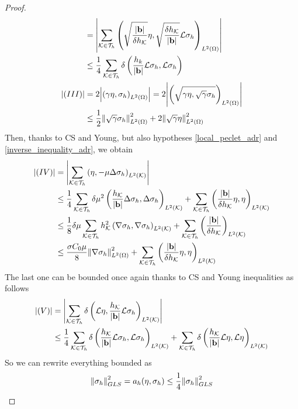 \begin{proof}
\begin{align*}
        & = \abs{\sum_{\mathcal{K}\in\mathcal{T}_h} \left( \sqrt{\frac{\abs{\textbf{b}}}{\delta h_{\mathcal{K}}}} \eta, \sqrt{\frac{\delta h_{\mathcal{K}}}{\abs{\textbf{b}}}} \mathcal{L}\sigma_h \right)_{L^2(\Omega)}} \\
        &\leq \frac{1}{4} \sum_{\mathcal{K}\in\mathcal{T}_h} \delta \left( \frac{h_k}{\abs{\textbf{b}}} \mathcal{L}\sigma_h, \mathcal{L}\sigma_h \right) \\
        \abs{(III)} &= 2\abs{\left( \gamma \eta, \sigma_h \right)_{L^2(\Omega)}} = 2\abs{\left( \sqrt{\gamma \eta, \sqrt{\gamma}\sigma_h} \right)_{L^2(\Omega)}} \\
        &\leq \frac{1}{2} \norm{\sqrt{\gamma}\sigma_h}_{L^2(\Omega)}^2 + 2 \norm{\sqrt{\gamma} \eta}_{L^2(\Omega)}^2
    \end{align*}
    Then, thanks to CS and Young, but also hypotheses \eqref{local_peclet_adr} and \eqref{inverse_inequality_adr}, we obtain 
    \begin{align*}
        \abs{(IV)} &= \abs{\sum_{\mathcal{K}\in\mathcal{T}_h} \left( \eta, -\mu \Delta \sigma_h \right)_{L^2(\mathcal{K})}} \\
        &\leq \frac{1}{4} \sum_{\mathcal{K}\in\mathcal{T}_h} \delta \mu^2 \left( \frac{h_{\mathcal{K}}}{\abs{\textbf{b}}}\Delta \sigma_h, \Delta \sigma_h \right)_{L^2(\mathcal{K})} + \sum_{\mathcal{K}\in\mathcal{T}_h} \left( \frac{\abs{\textbf{b}}}{\delta h_{\mathcal{K}}} \eta, \eta \right)_{L^2(\mathcal{K})} \\
        &\leq \frac{1}{8} \delta \mu \sum_{\mathcal{K}\in\mathcal{T}_h} h^2_{\mathcal{K}} \left( \nabla \sigma_h, \nabla \sigma_h \right)_{L^2(\mathcal{K})} + \sum_{\mathcal{K}\in\mathcal{T}_h} \left( \frac{\abs{\textbf{b}}}{\delta h_{\mathcal{K}}} \right)_{L^2(\mathcal{K})} \\
        &\leq \frac{\sigma C_0 \mu}{8} \norm{\nabla \sigma_h}_{L^2(\Omega)}^2 + \sum_{\mathcal{K}\in\mathcal{T}_h} \left( \frac{\abs{\textbf{b}}}{\delta h_{\mathcal{K}}}\eta, \eta \right)_{L^2(\mathcal{K})}
    \end{align*}
    The last one can be bounded once again thanks to CS and Young inequalities as follows 
    \begin{align*}
        \abs{(V)} &= \abs{\sum_{\mathcal{K}\in\mathcal{T}_h} \delta \left( \mathcal{L}\eta, \frac{h_{\mathcal{K}}}{\abs{\textbf{b}}}\mathcal{L}\sigma_h \right)_{L^2(\mathcal{K})}} \\
        &\leq \frac{1}{4} \sum_{\mathcal{K}\in\mathcal{T}_h} \delta \left( \frac{h_{\mathcal{K}}}{\abs{\textbf{b}}} \mathcal{L}\sigma_h, \mathcal{L}\sigma_h \right)_{L^2(\mathcal{K})} + \sum_{\mathcal{K}\in\mathcal{T}_h} \delta\left( \frac{h_{\mathcal{K}}}{\abs{\textbf{b}}} \mathcal{L}\eta, \mathcal{L}\eta \right)_{L^2(\mathcal{K})} 
    \end{align*}
    So we can rewrite everything bounded as 
    \begin{align*}
        \norm{\sigma_h}^2_{GLS} &= a_h(\eta, \sigma_h) \leq \frac{1}{4} \norm{\sigma_h}^2_{GLS} \\

\end{align*}
\end{proof}
